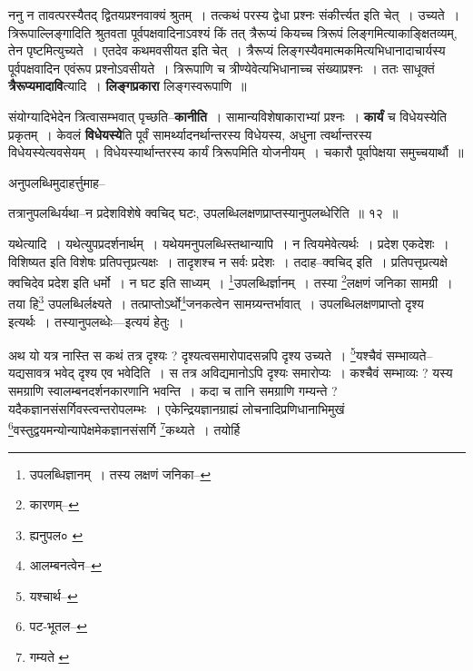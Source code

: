 \documentclass[article,12pt,a4paper]{memoir}
\begin{document}
	  \pstart ननु न तावत्परस्यैतद् द्वितयप्रश्नवाक्यं श्रुतम् । तत्कथं परस्य द्वेधा प्रश्नः संकीर्त्त्यत इति चेत् । उच्यते । त्रिरूपाल्लिङ्गादिति श्रुतवता पूर्वपक्षवादिनाऽवश्यं किं तत् त्रैरूप्यं कियच्च त्रिरूपं लिङ्गमित्याकाङ्क्षितव्यम्, तेन पृष्टमित्युच्यते । एतदेव कथमवसीयत इति चेत् । त्रैरूप्यं लिङ्गस्यैवमात्मकमित्यभिधानादाचार्यस्य पूर्वपक्षवादिन एवंरूप प्रश्नोऽवसीयते । त्रिरूपाणि च त्रीण्येवेत्यभिधानाच्च संख्याप्रश्नः । ततः साधूक्तं \textbf{त्रैरूप्यमादावि}त्यादि । \textbf{लिङ्गप्रकारा} लिङ्गस्वरूपाणि ॥
	\pend
      

	  \pstart संयोग्यादिभेदेन त्रित्वासम्भवात् पृच्छति--\textbf{कानीति} । सामान्यविशेषाकाराभ्यां प्रश्नः । \textbf{कार्यं} च विधेयस्येति प्रकृतम् । केवलं \textbf{विधेयस्ये}ति पूर्वं सामर्थ्यादनर्थान्तरस्य विधेयस्य, अधुना त्वर्थान्तरस्य विधेयस्येत्यवसेयम् । विधेयस्यार्थान्तरस्य कार्यं त्रिरूपमिति योजनीयम् । चकारौ पूर्वापेक्षया समुच्चयार्थौ ॥
	\pend
      \leavevmode{}
	  \bigskip
	  \begingroup
	

	  \pstart अनुपलब्धिमुदाहर्त्तुमाह--
	\pend
       
	  \bigskip
	  \begingroup
	

	  \pstart तत्रानुपलब्धिर्यथा--न प्रदेशविशेषे क्वचिद् घटः, उपलब्धिलक्षणप्राप्तस्यानुपलब्धेरिति ॥ १२ ॥
	\pend
      
	  \endgroup
	 

	  \pstart यथेत्यादि । यथेत्युपप्रदर्शनार्थम् । यथेयमनुपलब्धिस्तथान्यापि । न त्वियमेवेत्यर्थः । प्रदेश एकदेशः । विशिष्यत इति विशेषः प्रतिपत्तृप्रत्यक्षः । तादृशश्च न सर्वः प्रदेशः । तदाह--क्वचिद् इति । प्रतिपत्तृप्रत्यक्षे क्वचिदेव प्रदेश इति धर्मो । न घट इति साध्यम् । \footnote{उपलब्धिज्ञानम् । तस्य लक्षणं जनिका--\cite{dp-msA}}उपलब्धिर्ज्ञानम् । तस्या \footnote{कारणम्--\cite{dp-msD-n}}लक्षणं जनिका सामग्री । तया हि\footnote{ह्यनुपल० \cite{dp-edH}} उपलब्धिर्लक्ष्यते । तत्प्राप्तोऽर्थो\footnote{आलम्बनत्वेन--\cite{dp-msD-n}}जनकत्वेन सामग्र्यन्तर्भावात् । उपलब्धिलक्षणप्राप्तो दृश्य इत्यर्थः । तस्यानुपलब्धेः—इत्ययं हेतुः ।
	\pend
       

	  \pstart अथ यो यत्र नास्ति स कथं तत्र दृश्यः ? दृश्यत्वसमारोपादसन्नपि दृश्य उच्यते । \footnote{यश्चार्थ--\cite{dp-msD-n}}यश्चैवं सम्भाव्यते--यद्यसावत्र भवेद् दृश्य एव भवेदिति । स तत्र अविद्यमानोऽपि दृश्यः समारोप्यः । कश्चैवं सम्भाव्यः ? यस्य समग्राणि स्वालम्बनदर्शनकारणानि भवन्ति । कदा च तानि समग्राणि गम्यन्ते ? यदैकज्ञानसंसर्गिवस्त्वन्तरोपलम्भः । एकेन्द्रियज्ञानग्राह्यं लोचनादिप्रणिधानाभिमुखं \footnote{पट-भूतल--\cite{dp-msD-n}}वस्तुद्वयमन्योन्यापेक्षमेकज्ञानसंसर्गि \footnote{गम्यते \cite{dp-msB}}कथ्यते । तयोर्हि
	\pend
      
\end{document}
